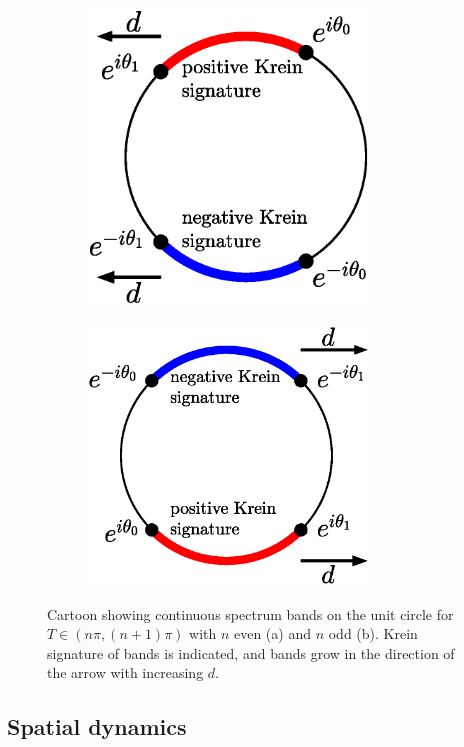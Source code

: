 \documentclass[12pt,reqno]{amsart}
\theoremstyle{definition}
\begin{document}
\begin{figure}
	\begin{center}
	\begin{subfigure}{0.45\linewidth}
		\caption{}
		\includegraphics[width=7.5cm]{contspeccartoon1.eps}
	\end{subfigure}
	\begin{subfigure}{0.45\linewidth}
		\caption{}
		\includegraphics[width=7.5cm]{contspeccartoon2.eps}
	\end{subfigure}
	\end{center}
	\caption{Cartoon showing continuous spectrum bands on the unit circle for $T \in (n \pi, (n+1)\pi)$ with $n$ even (a) and $n$ odd (b). Krein signature of bands is indicated, and bands grow in the direction of the arrow with increasing $d$.}
	\label{fig:bands}
\end{figure}

\subsection{Spatial dynamics}
\end{document}
